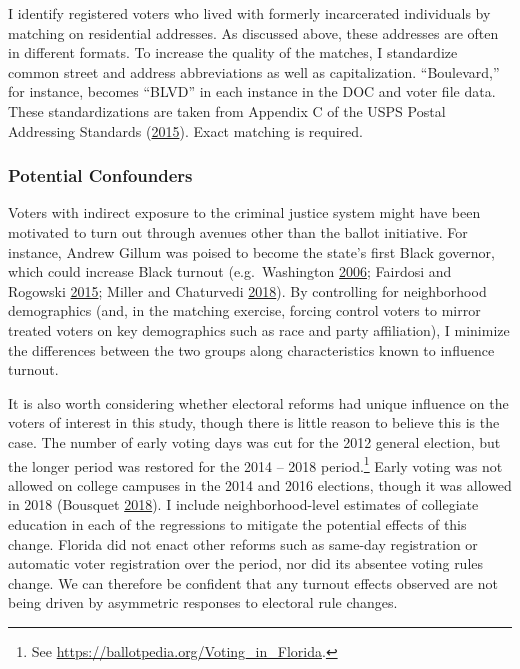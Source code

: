 \documentclass[
  12pt,
]{article}
\begin{document}
I identify registered voters who lived with formerly incarcerated individuals by matching on residential addresses. As discussed above, these addresses are often in different formats. To increase the quality of the matches, I standardize common street and address abbreviations as well as capitalization. ``Boulevard,'' for instance, becomes ``BLVD'' in each instance in the DOC and voter file data. These standardizations are taken from Appendix C of the USPS Postal Addressing Standards (\protect\hyperlink{ref-USPS2015}{2015}). Exact matching is required.

\hypertarget{potential-confounders}{%
\subsubsection*{Potential Confounders}\label{potential-confounders}}

Voters with indirect exposure to the criminal justice system might have been motivated to turn out through avenues other than the ballot initiative. For instance, Andrew Gillum was poised to become the state's first Black governor, which could increase Black turnout (e.g.~Washington \protect\hyperlink{ref-Washington2006}{2006}; Fairdosi and Rogowski \protect\hyperlink{ref-Fairdosi2015}{2015}; Miller and Chaturvedi \protect\hyperlink{ref-Miller2018}{2018}). By controlling for neighborhood demographics (and, in the matching exercise, forcing control voters to mirror treated voters on key demographics such as race and party affiliation), I minimize the differences between the two groups along characteristics known to influence turnout.

It is also worth considering whether electoral reforms had unique influence on the voters of interest in this study, though there is little reason to believe this is the case. The number of early voting days was cut for the 2012 general election, but the longer period was restored for the 2014 -- 2018 period.\footnote{See \url{https://ballotpedia.org/Voting_in_Florida}.} Early voting was not allowed on college campuses in the 2014 and 2016 elections, though it was allowed in 2018 (Bousquet \protect\hyperlink{ref-Bousquet2018a}{2018}). I include neighborhood-level estimates of collegiate education in each of the regressions to mitigate the potential effects of this change. Florida did not enact other reforms such as same-day registration or automatic voter registration over the period, nor did its absentee voting rules change. We can therefore be confident that any turnout effects observed are not being driven by asymmetric responses to electoral rule changes.
\end{document}
